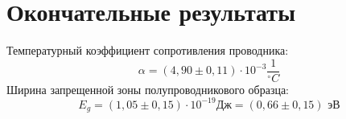 \section{Окончательные результаты}
\noindent Температурный коэффициент сопротивления проводника:
\[\alpha = (4,90\pm0,11) \cdot 10^{-3}\frac{ 1}{{}^\circ C}\]
Ширина запрещенной зоны полупроводникового образца:
\[E_g = (1,05\pm0,15)\cdot10^{-19}\textit{Дж}=(0,66\pm0,15)\textit{ эВ}\]

